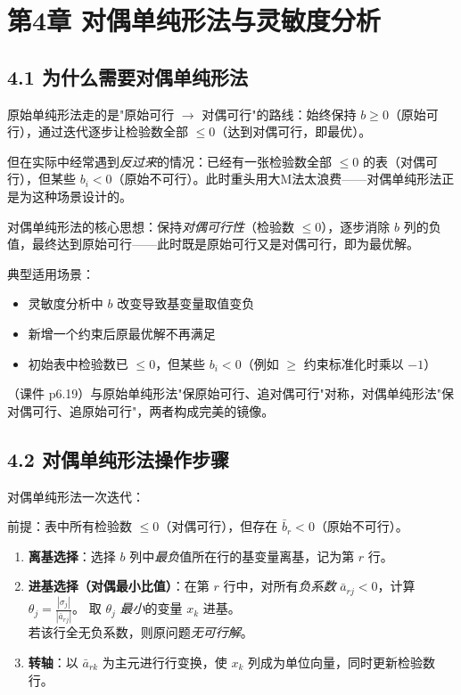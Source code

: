 \section{第4章 \quad 对偶单纯形法与灵敏度分析}

\subsection{4.1 为什么需要对偶单纯形法}

原始单纯形法走的是"原始可行 $\to$ 对偶可行"的路线：始终保持 $b \ge 0$（原始可行），通过迭代逐步让检验数全部 $\le 0$（达到对偶可行，即最优）。

但在实际中经常遇到\emph{反过来}的情况：已经有一张检验数全部 $\le 0$ 的表（对偶可行），但某些 $b_i < 0$（原始不可行）。此时重头用大M法太浪费——对偶单纯形法正是为这种场景设计的。

对偶单纯形法的核心思想：保持\emph{对偶可行性}（检验数 $\le 0$），逐步消除 $b$ 列的负值，最终达到原始可行——此时既是原始可行又是对偶可行，即为最优解。

典型适用场景：
\begin{itemize}
  \item 灵敏度分析中 $b$ 改变导致基变量取值变负
  \item 新增一个约束后原最优解不再满足
  \item 初始表中检验数已 $\le 0$，但某些 $b_i < 0$（例如 $\ge$ 约束标准化时乘以 $-1$）
\end{itemize}

（课件 p6.19）与原始单纯形法"保原始可行、追对偶可行"对称，对偶单纯形法"保对偶可行、追原始可行"，两者构成完美的镜像。

\subsection{4.2 对偶单纯形法操作步骤}

对偶单纯形法一次迭代：

前提：表中所有检验数 $\le 0$（对偶可行），但存在 $\bar{b}_r < 0$（原始不可行）。

\begin{enumerate}
  \item \textbf{离基选择}：选择 $b$ 列中\emph{最负}值所在行的基变量离基，记为第 $r$ 行。
  \item \textbf{进基选择（对偶最小比值）}：在第 $r$ 行中，对所有\emph{负系数} $\bar{a}_{rj} < 0$，计算
        $\displaystyle \theta_j = \frac{|\sigma_j|}{|\bar{a}_{rj}|}$。
        取 $\theta_j$ \emph{最小}的变量 $x_k$ 进基。\\
        若该行全无负系数，则原问题\emph{无可行解}。
  \item \textbf{转轴}：以 $\bar{a}_{rk}$ 为主元进行行变换，使 $x_k$ 列成为单位向量，同时更新检验数行。
\end{enumerate}

